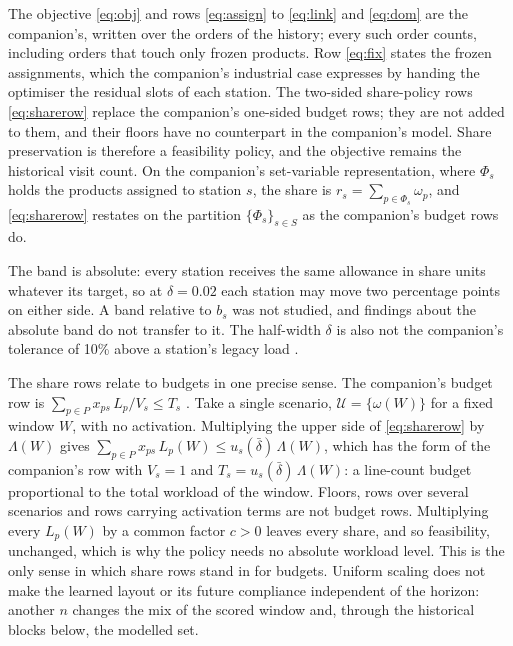 The objective \eqref{eq:obj} and rows \eqref{eq:assign} to \eqref{eq:link} and \eqref{eq:dom} are the companion's, written over the orders of the history; every such order counts, including orders that touch only frozen products. Row \eqref{eq:fix} states the frozen assignments, which the companion's industrial case expresses by handing the optimiser the residual slots of each station. The two-sided share-policy rows \eqref{eq:sharerow} replace the companion's one-sided budget rows; they are not added to them, and their floors have no counterpart in the companion's model. Share preservation is therefore a feasibility policy, and the objective remains the historical visit count. On the companion's set-variable representation, where $\Phi_s$ holds the products assigned to station $s$, the share is $r_s=\sum_{p\in\Phi_s}\omega_p$, and \eqref{eq:sharerow} restates on the partition $\{\Phi_s\}_{s\in S}$ as the companion's budget rows do.

The band is absolute: every station receives the same allowance in share units whatever its target, so at $\delta=0.02$ each station may move two percentage points on either side. A band relative to $b_s$ was not studied, and findings about the absolute band do not transfer to it. The half-width $\delta$ is also not the companion's tolerance of 10\% above a station's legacy load \citep{belul_companion}.

The share rows relate to budgets in one precise sense. The companion's budget row is $\sum_{p\in P}x_{ps}\,L_p/V_s\le T_s$ \citep{belul_companion}. Take a single scenario, $\mathcal U=\{\omega(W)\}$ for a fixed window $W$, with no activation. Multiplying the upper side of \eqref{eq:sharerow} by $\Lambda(W)$ gives $\sum_{p\in P}x_{ps}\,L_p(W)\le u_s(\bar\delta)\,\Lambda(W)$, which has the form of the companion's row with $V_s=1$ and $T_s=u_s(\bar\delta)\,\Lambda(W)$: a line-count budget proportional to the total workload of the window. Floors, rows over several scenarios and rows carrying activation terms are not budget rows. Multiplying every $L_p(W)$ by a common factor $c>0$ leaves every share, and so feasibility, unchanged, which is why the policy needs no absolute workload level. This is the only sense in which share rows stand in for budgets. Uniform scaling does not make the learned layout or its future compliance independent of the horizon: another $n$ changes the mix of the scored window and, through the historical blocks below, the modelled set.

